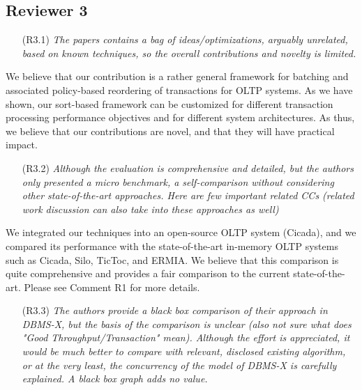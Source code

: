 \documentclass{article}
\newcommand{\todo}[1]{}
\newcommand{\changed}[1]{#1}
\newcommand{\todo}[1]{\textcolor{red}{\bf [TODO!: #1]}}
\newcommand{\changed}[1]{{\color{blue}#1}}
\begin{document}
\subsection{Reviewer 3}

\begin{itemize}
\item[(R3.1)] \emph{The papers contains a bag of ideas/optimizations, arguably unrelated,
	based on known techniques, so the overall contributions and novelty is
	limited.}
\end{itemize}

\changed{
	We believe that our contribution is a rather general framework for batching and associated policy-based reordering of transactions for OLTP systems. As we have shown, our sort-based framework can be customized for different transaction processing performance objectives and for different system architectures. As thus, we believe that our contributions are novel, and that they will have practical impact.
}

\begin{itemize}
\item[(R3.2)] \emph{Although the evaluation is comprehensive and detailed, but the authors
	only presented a micro benchmark, a self-comparison without considering
	other state-of-the-art approaches. Here are few important related CCs
	(related work discussion can also take into these approaches as well)}
\end{itemize}

\changed{
	 We integrated our techniques into an open-source OLTP system (Cicada), and we compared its performance with the state-of-the-art in-memory OLTP systems such as Cicada, Silo, TicToc, and ERMIA. We believe that this comparison is quite comprehensive and provides a fair comparison to the current state-of-the-art. Please see Comment R1 for more details.
}

\begin{itemize}
\item[(R3.3)] \emph{The authors provide a black box comparison of their approach in DBMS-X,
	but the basis of the comparison is unclear (also not sure what does
	"Good Throughput/Transaction" mean). Although the effort is appreciated,
	it would be much better to compare with relevant, disclosed existing
	algorithm, or at the very least, the concurrency of the model of DBMS-X is
	carefully explained. A black box graph adds no value.}
\end{itemize}
\end{document}
